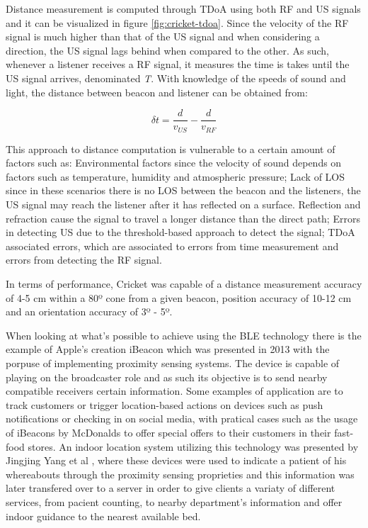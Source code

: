 Distance measurement is computed through \ac{TDoA} using both \ac{RF} and \ac{US} signals and it can be visualized in figure \ref{fig:cricket-tdoa}. Since the velocity of the \ac{RF} signal is much higher than that of the \ac{US} signal and when considering a direction, the \ac{US} signal lags behind when compared to the other. As such, whenever a listener receives a \ac{RF} signal, it measures the time is takes until the \ac{US} signal arrives, denominated \textit{\delta T}. With knowledge of the speeds of sound and light, the distance between beacon and listener can be obtained from:

$$ \delta t = \frac{d}{v_{US}} - \frac{d}{v_{RF}}  $$

This approach to distance computation is vulnerable to a certain amount of factors such as: Environmental factors since the velocity of sound depends on factors such as temperature, humidity and atmospheric pressure; Lack of \ac{LOS} since in these scenarios there is no \ac{LOS} between the beacon and the listeners, the \ac{US} signal may reach the listener after it has reflected on a surface. Reflection and refraction cause the signal to travel a longer distance than the direct path; Errors in detecting \ac{US} due to the threshold-based approach to detect the signal; \ac{TDoA} associated errors, which are associated to errors from time measurement and errors from detecting the \ac{RF} signal.

In terms of performance, Cricket was capable of a distance measurement accuracy of 4-5 cm within a 80º cone from a given beacon, position accuracy of 10-12 cm and an orientation accuracy of 3º - 5º.



\label{subsec:ble}
	

When looking at what's possible to achieve using the BLE technology there is the example of Apple's creation iBeacon \cite{ibeacon} which was presented in 2013 with the porpuse of implementing proximity sensing systems. The device is capable of playing on the broadcaster role and as such its objective is to send nearby compatible receivers certain information. Some examples of application are to track customers or trigger location-based actions on devices such as push notifications or checking in on social media, with pratical cases such as the usage of iBeacons by McDonalds to offer special offers to their customers in their fast-food stores. An indoor location system utilizing this technology was presented by Jingjing Yang et al \cite{ibeacon1}, where these devices were used to indicate a patient of his whereabouts through the proximity sensing proprieties and this information was later transfered over to a server in order to give clients a variaty of different services, from pacient counting, to nearby department's information and offer indoor guidance to the nearest available bed. 

